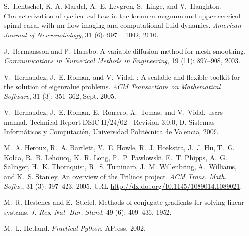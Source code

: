 \begin{thebibliography}{467}
S.~Hentschel, K.-A. Mardal, A.~E. L{\o}vgren, S.~Linge, and V.~Haughton.
\newblock Characterization of cyclical csf flow in the foramen magnum and upper
  cervical spinal canal with mr flow imaging and computational fluid dynamics.
\newblock \emph{American Journal of Neuroradiology}, 31 (6):
  997 -- 1002, 2010.

J.~Hermansson and P.~Hansbo.
\newblock A variable diffusion method for mesh smoothing.
\newblock \emph{Communications in Numerical Methods in Engineering},
  19 (11): 897--908, 2003.

V.~Hernandez, J.~E. Roman, and V.~Vidal.
: A scalable and flexible toolkit for the solution of
  eigenvalue problems.
\newblock \emph{ACM Transactions on Mathematical Software}, 31
  (3): 351--362, Sept. 2005.

V.~Hernandez, J.~E. Roman, E.~Romero, A.~Tomas, and V.~Vidal.
 users manual.
\newblock Technical Report DSIC-II/24/02 - Revision 3.0.0, D. Sistemas
  Inform\'aticos y Computaci\'on, Universidad Polit\'ecnica de Valencia, 2009.

M.~A. Heroux, R.~A. Bartlett, V.~E. Howle, R.~J. Hoekstra, J.~J. Hu, T.~G.
  Kolda, R.~B. Lehoucq, K.~R. Long, R.~P. Pawlowski, E.~T. Phipps, A.~G.
  Salinger, H.~K. Thornquist, R.~S. Tuminaro, J.~M. Willenbring, A.~Williams,
  and K.~S. Stanley.
\newblock An overview of the {T}rilinos project.
\newblock \emph{ACM Trans. Math. Softw.}, 31 (3): 397--423,
  2005.
\newblock URL \url{http://dx.doi.org/10.1145/1089014.1089021}.

M.~R. Hestenes and E.~Stiefel.
\newblock Methods of conjugate gradients for solving linear systems.
\newblock \emph{J. Res. Nat. Bur. Stand}, 49 (6): 409--436,
  1952.

M.~L. Hetland.
\newblock \emph{Practical Python}.
\newblock APress, 2002.


\end{thebibliography}
